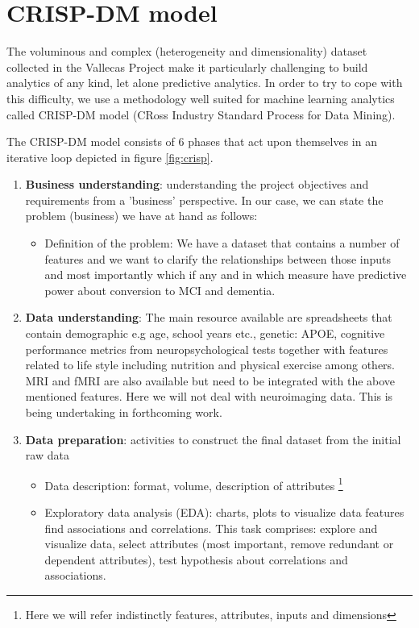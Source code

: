\documentclass[11pt]{article}
\begin{document}
\section{CRISP-DM model}
\label{se:crisp}
The voluminous and complex (heterogeneity and dimensionality) dataset collected in the Vallecas Project make it particularly challenging to build analytics of any kind, let alone predictive analytics.
In order to try to cope with this difficulty, we use a methodology well suited for machine learning analytics called CRISP-DM model (CRoss Industry Standard Process for Data Mining).
  
The CRISP-DM model consists of 6 phases that act upon themselves in an iterative loop depicted in figure \ref{fig:crisp}.
\begin{enumerate}
\item \textbf{Business understanding}: understanding the project objectives and requirements from a 'business' perspective. In our case, we can state the problem (business) we have at hand as follows: 
	\begin{itemize}
		\item Definition of the problem: We have a dataset that contains a number of features and we want to clarify the relationships between those inputs and most importantly which if any and in which measure have predictive power about conversion to MCI and dementia.
	\end{itemize}
\item \textbf{Data understanding}: The main resource available are spreadsheets that contain demographic e.g age, school years etc., genetic: APOE, cognitive performance metrics from neuropsychological tests together with features related to life style including nutrition and physical exercise among others. MRI and fMRI are also available but need to be integrated with the above mentioned features. Here we will not deal with neuroimaging data. This is being undertaking in forthcoming work.
\item \textbf{Data preparation}: activities to construct the final dataset from the initial raw data
	\begin{itemize}
		\item Data description: format, volume, description of attributes \footnote{Here we will refer indistinctly features, attributes, inputs and dimensions}
		\item Exploratory data analysis (EDA): charts, plots to visualize data features find associations and correlations. This task comprises: explore and visualize data, select attributes (most important, remove redundant or dependent attributes), test hypothesis about correlations and associations.

\end{itemize}
\end{enumerate}
\end{document}
